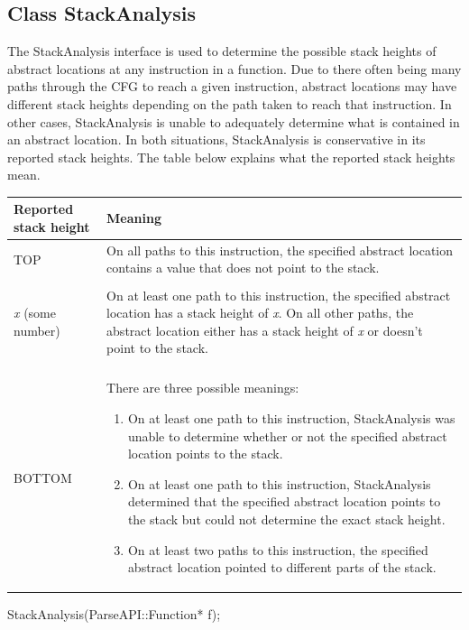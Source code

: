 \subsection{Class StackAnalysis}
\label{sec:stackanalysis}


The StackAnalysis interface is used to determine the possible stack heights of abstract locations at any instruction in a function.  Due to there often being many paths through the CFG to reach a given instruction, abstract locations may have different stack heights depending on the path taken to reach that instruction.  In other cases, StackAnalysis is unable to adequately determine what is contained in an abstract location.  In both situations, StackAnalysis is conservative in its reported stack heights.  The table below explains what the reported stack heights mean.

\begin{tabular}{p{1.25in}p{4.25in}}
	\toprule
	Reported stack height & Meaning \\
	\midrule
	TOP & On all paths to this instruction, the specified abstract location contains a value that does not point to the stack. \\\\
	\emph{x} (some number) & On at least one path to this instruction, the specified abstract location has a stack height of \emph{x}.  On all other paths, the abstract location either has a stack height of \emph{x} or doesn't point to the stack. \\\\
	BOTTOM & There are three possible meanings:
	  \begin{enumerate}
		\item On at least one path to this instruction, StackAnalysis was unable to determine whether or not the specified abstract location points to the stack.
		\item On at least one path to this instruction, StackAnalysis determined that the specified abstract location points to the stack but could not determine the exact stack height.
		\item On at least two paths to this instruction, the specified abstract location pointed to different parts of the stack.
	  \end{enumerate} \\
	\bottomrule
\end{tabular}

\begin{apient}
	StackAnalysis(ParseAPI::Function* f);
\end{apient}

